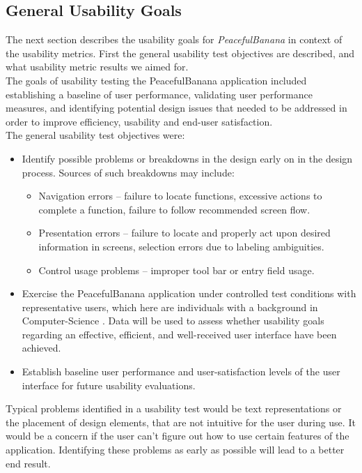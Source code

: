 \subsection{General Usability Goals}
The next section describes the usability goals for \emph{PeacefulBanana} in context of the usability metrics. First the general usability test objectives are described, and what usability metric results we aimed for.\\ 
The goals of usability testing the PeacefulBanana application included establishing a baseline of user performance, validating user performance measures, and identifying potential design issues that needed to be addressed in order to improve efficiency, usability and end-user satisfaction. \\
The general usability test objectives were:
\begin{itemize}
	\item Identify possible problems or breakdowns in the design\citep{wright1989evaluation} early on in the design process. Sources of such breakdowns may include:
		\begin{itemize}
			\item Navigation errors – failure to locate functions, excessive actions to complete a function, failure to follow recommended screen flow.
			\item Presentation errors – failure to locate and properly act upon desired information in screens, selection errors due to labeling ambiguities.
			\item Control usage problems – improper tool bar or entry field usage.
		\end{itemize}
	\item Exercise the PeacefulBanana application under controlled test conditions with representative users, which here are individuals with a background in Computer-Science
	. Data will be used to assess whether usability goals regarding an effective, efficient, and well-received user interface have been achieved.
	\item Establish baseline user performance and user-satisfaction levels of the user interface for future usability evaluations.
\end{itemize}
Typical problems identified in a usability test would be text representations or the placement of design elements, that are not intuitive for the user during use. It would be a concern if the user can't figure out how to use certain features of the application. Identifying these problems as early as possible will lead to a better end result. 

